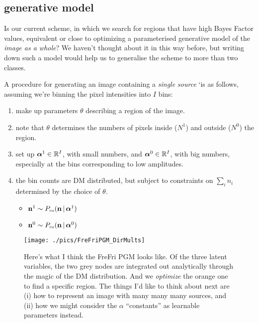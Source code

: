 \documentclass[12pt]{article}
\begin{document}
\subsection{generative model}
Is our current scheme, in which we search for regions that have high
Bayes Factor values, equivalent or close to optimizing a parameterised
generative model of the \emph{image as a whole}? We haven't thought about it
in this way before, but writing down such a model would help us to
generalise the scheme to more than two classes.

A procedure for generating an image containing a \emph{single source}
`is as follows, assuming we're binning the pixel intensities into $I$ bins:
\begin{enumerate}
\item make up parameters $\theta$ describing a region of the image.
\item note that $\theta$ determines the numbers of pixels inside ($N^1$)  and  outside ($N^0$) the region.
\item set up $\boldsymbol\alpha^1 \in \mathbb{R}^I$, with small numbers,
  and $\boldsymbol\alpha^0 \in \mathbb{R}^I$, with big numbers, especially at the bins corresponding to low amplitudes.
\item the bin counts are DM distributed, but subject to constraints on $\sum_i n_i$ determined by the choice of $\theta$.
  \begin{itemize}
    \item    $\mathbf{n}^1 \sim P_\text{\tiny\sc dm}(\mathbf{n} \,|\, \boldsymbol\alpha^1)$
    \item $\mathbf{n}^0 \sim P_\text{\tiny\sc dm}(\mathbf{n} \,|\, \boldsymbol\alpha^0)$
  \end{itemize}
\end{enumerate}


\begin{figure}
\texttt{[image: ./pics/FreFriPGM\_DirMults]}
\caption{Here's what I think the {\sc FreFri} PGM looks like. Of the three latent variables, the two grey nodes are integrated out analytically through the magic of the DM distribution. And we {\it optimize} the orange one to find a specific region. 
The things I'd like to think about next are (i) how to represent an image with many many many sources, and (ii) how we might consider the $\alpha$ ``constants'' as learnable parameters instead.
\label{fig:FreFriPGM_DirMults}
}
\end{figure}
\end{document}
